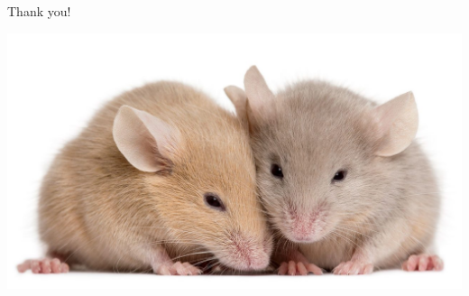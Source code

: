 \begin{frame}
\begin{center}
\vspace{2.9cm}
\Large Thank you!\vspace{1.7cm}

\includegraphics[scale=0.15]{gfx/mouse5.jpg}
\end{center}

\end{frame}


